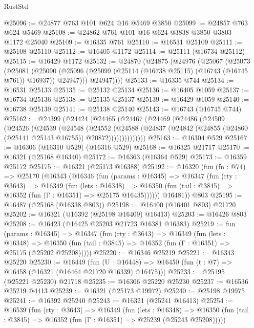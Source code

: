 \begin{lexlean}{RustStd}
\begin{coremodule}
@25096 := @24877 @763 @101 @624 @16 @5469 @3850
@25099 := @24857 @763 @624 @5469
@25108 := @24862 @761 @101 @16 @624 @3838 @3850 @3803 @1172 @25040
@25109 := @16335 @761
@25110 := @16531 @25109
@25111 := @25108 @25110
@25112 := @16405 @1172
@25114 := @25111 (@16734 @25112)
@25115 := @16429 @1172
@25132 := @24870
    (@24875
      (@24976
        (@25067
          (@25073
            (@25081
              (@25090
                (@25096 (@25099 (@25114 (@16738 @25115) (@16743 (@16745 @761)) @16937)) @24947)))
            @24947))))
@25133 := @16335 @744
@25134 := @16531 @25133
@25135 := @25132 @25134
@25136 := @16405 @1059
@25137 := @16734 @25136
@25138 := @25135 @25137
@25139 := @16429 @1059
@25140 := @16738 @25139
@25141 := @25138 @25140
@25143 := @16743 (@16745 @744)
@25162 := @24399
    (@24424
      (@24465
        (@24467
          (@24469
            (@24486
              (@24509
                (@24526
                  (@24539
                    (@24548
                      (@24552
                        (@24588
                          (@24837
                            (@24842 (@24855 (@24860 (@25141 @25143 @16755)) @20872))))))))))))))
@25163 := @16304 @529
@25167 := @16306 (@16310 @529) (@16316 @529)
@25168 := @16325 @21717
@25170 := @16321 (@25168 @16340)
@25172 := @16363 (@16364 @529)
@25173 := @16359 @25172
@25175 := @16321 (@25173 @16388)
@25192 := @16320
    (fun (fn : @74) =>
    @25170
      (@16343
        (@16346
          (fun (params : @16345) =>
          @16347
            (fun (rty : @3643) =>
            @16349
              (fun (lets : @16348) =>
              @16350 (fun (tail : @3845) => @16352 (fun (Γ : @16351) => @25175 @16435))))))
        @16481))
    @803
@25195 := @16487 (@25168 (@16338 @803))
@25198 := @16400 (@16401 @803) @21720
@25202 := @16321 (@16392 (@25198 @16409) @16413)
@25203 := @16426 @803
@25208 := @16423 (@16425 @25203 @21723 @16381 @16383)
@25219 := fun (params : @16345) =>
  @16347
    (fun (rty : @3643) =>
    @16349
      (fun (lets : @16348) =>
      @16350 (fun (tail : @3845) => @16352 (fun (Γ : @16351) => @25175 (@25202 @25208)))))
@25220 := @16346 @25219
@25221 := @16343 @25220
@25230 := @16449
    (fun (U : @16448) => @16450 (fun (t : @7) => @16458 (@16321 (@16464 @21720 @16339) @16475)))
@25233 := @25195 (@25221 @25230) @21718
@25235 := @16306 @25220 @25230
@25237 := @16536 @25219 @4413
@25239 := @16321 (@25173 @19972)
@25240 := @25198 @19975
@25241 := @16392 @25240
@25243 := @16321 (@25241 @16413)
@25254 := @16539
    (fun (rty : @3643) =>
    @16349
      (fun (lets : @16348) =>
      @16350 (fun (tail : @3845) => @16352 (fun (Γ : @16351) => @25239 (@25243 @25208)))))

\end{coremodule}
\end{lexlean}
